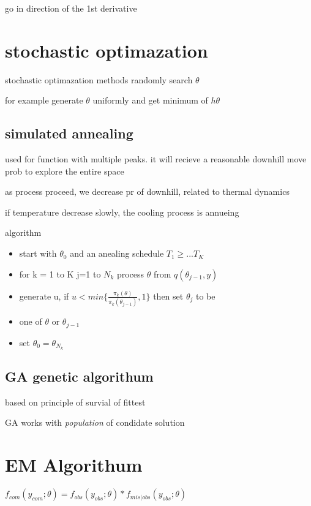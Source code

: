 \documentclass[10pt]{article}
\theoremstyle{break}
\begin{document}
                go in direction of the 1st derivative
    \section{stochastic optimazation}
        stochastic optimazation methods randomly search $\theta$ 

        for example generate $\theta$ uniformly and get minimum of $h\theta$ 
        
        \subsection{simulated annealing}
            used for function with multiple peaks. it will recieve a reasonable downhill move prob to explore 
            the entire space 

            as process proceed, we decrease pr of downhill, related to thermal dynamics 

            if temperature decrease slowly, the cooling process is annueing

            algorithm
            \begin{itemize}
                \item start with $\theta_0$ and an anealing schedule $T_1\geq ... T_K$
                \item for k = 1 to K j=1 to $N_k$ process $\theta$ from $q(\theta_{j-1}, y)$
                \item generate u, if $u<min\{\frac{\pi_k(\theta)}{\pi_k(\theta_{j-1})},1\}$ then set $\theta_j$ to be 
                \item one of $\theta$ or $\theta_{j-1}$
                \item set $\theta_0 = \theta_{N_k}$
            \end{itemize}
        \subsection{GA genetic algorithum}
            based on principle of survial of fittest 

            GA works with \emph{population} of condidate solution 
            
    \section{EM Algorithum}
        $f_{com}(y_{com};\theta)=f_{obs}(y_{obs}; \theta)* f_{mis|obs}(y_{obs};\theta)$
\end{document}
